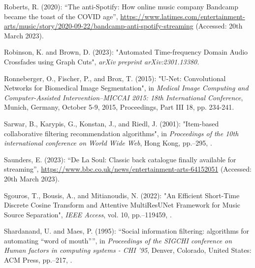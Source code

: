 \documentclass[11pt,titlepage,oneside]{book}
\begin{document}
\begin{thebibliography}{97}
	Roberts, R. (2020): \enquote{The anti-{Spotify}: {How} online music company
		{Bandcamp} became the toast of the {COVID} age},
	\urlprefix\url{https://www.latimes.com/entertainment-arts/music/story/2020-09-22/bandcamp-anti-spotify-streaming} (Accessed: 20th March 2023).

	Robinson, K. and Brown, D. (2023): "Automated {Time}-frequency {Domain}
		{Audio} {Crossfades} using {Graph} {Cuts}", \textit{arXiv preprint arXiv:2301.13380.}
	
	Ronneberger, O., Fischer, P., and Brox, T. (2015): "U-{Net}:
		{Convolutional} {Networks} for {Biomedical} {Image} {Segmentation}", in \textit{Medical Image Computing and Computer-Assisted Intervention–MICCAI 2015: 18th International Conference}, Munich, Germany, October 5-9, 2015, Proceedings, Part III 18, pp. 234-241. 
	
	Sarwar, B., Karypis, G., Konstan, J., and Riedl, J. (2001): "Item-based
		collaborative filtering recommendation algorithms", in \textit{Proceedings of
		the 10th international conference on {World} {Wide} {Web}}, Hong Kong, pp.--295, .
	
	Saunders, E. (2023): \enquote{De {La} {Soul}: {Classic} back catalogue finally
		available for streaming}, \urlprefix\url{https://www.bbc.co.uk/news/entertainment-arts-64152051} (Accessed: 20th March 2023).
	
	Sgouros, T., Bousis, A., and Mitianoudis, N. (2022): "An {Efficient}
		{Short}-{Time} {Discrete} {Cosine} {Transform} and {Attentive} {MultiResUNet}
		{Framework} for {Music} {Source} {Separation}", \textit{IEEE Access}, vol. 10,
	pp.--119459, .
	
	Shardanand, U. and Maes, P. (1995): \enquote{Social information filtering:
		algorithms for automating “word of mouth”}, in \textit{Proceedings of the
		{SIGCHI} conference on {Human} factors in computing systems - {CHI} '95},
	Denver, Colorado, United States: ACM Press, pp.--217,
	.
	

\end{thebibliography}
\end{document}
